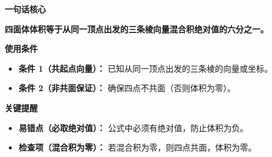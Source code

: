 \begin{summarybox}
	\textbf{\textcolor{CSummary}{一句话核心}}

	\textbf{四面体体积等于从同一顶点出发的三条棱向量混合积绝对值的六分之一。}

	\medskip
	\textbf{\textcolor{CSummary}{使用条件}}
	\begin{itemize}[leftmargin=*, itemsep=0.5em, topsep=0.4em]
		\item \textbf{条件 1（共起点向量）：} 已知从同一顶点出发的三条棱的向量或坐标。
		\item \textbf{条件 2（非共面保证）：} 确保四点不共面（否则体积为零）。
	\end{itemize}

	\medskip
	\textbf{\textcolor{CSummary}{关键提醒}}
	\begin{itemize}[leftmargin=*, itemsep=0.5em, topsep=0.4em]
		\item \textbf{易错点（必取绝对值）：} 公式中必须有绝对值，防止体积为负。
		\item \textbf{检查项（混合积为零）：} 若混合积为零，则四点共面，体积为零。
	\end{itemize}
\end{summarybox}
